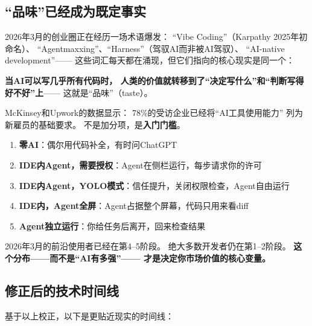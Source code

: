 \subsection{``品味''已经成为既定事实}

2026年3月的创业圈正在经历一场术语爆发：
``Vibe Coding''（Karpathy 2025年初命名）、
``Agentmaxxing''、``Harness''（驾驭AI而非被AI驾驭）、
``AI-native development''——
这些词汇每天都在涌现，但它们指向的核心现实是同一个：

\textbf{当AI可以写几乎所有代码时，
人类的价值就转移到了``决定写什么''和``判断写得好不好''上}——
这就是``品味''（taste）。

McKinsey和Upwork的数据显示：
78\%的受访企业已经将``AI工具使用能力''
列为新雇员的基础要求。
不是加分项，是\textbf{入门门槛}。

\begin{keybox}
\begin{enumerate}
  \item \textbf{零AI}：偶尔用代码补全，有时问ChatGPT
  \item \textbf{IDE内Agent，需要授权}：Agent在侧栏运行，每步请求你的许可
  \item \textbf{IDE内Agent，YOLO模式}：信任提升，关闭权限检查，Agent自由运行
  \item \textbf{IDE内，Agent全屏}：Agent占据整个屏幕，代码只用来看diff
  \item \textbf{Agent独立运行}：你给任务后离开，回来检查结果
\end{enumerate}
2026年3月的前沿使用者已经在第4--5阶段。
绝大多数开发者仍在第1--2阶段。
\textbf{这个分布——而不是``AI有多强''——
才是决定你市场价值的核心变量。}
\end{keybox}

\subsection{修正后的技术时间线}

基于以上校正，以下是更贴近现实的时间线：

